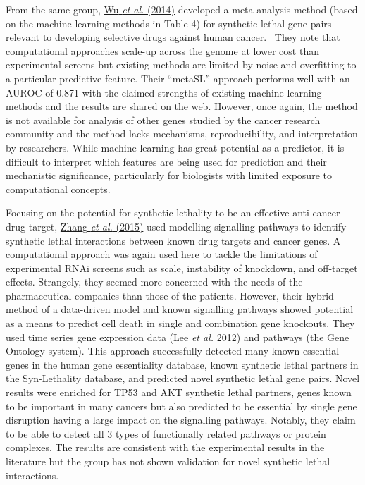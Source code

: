 From the same group,
\hyperlink{ENREF114}{Wu}\hyperlink{ENREF114}{\textit{ et
al.}}\hyperlink{ENREF114}{ (2014)} developed a meta-analysis method
(based on the machine learning methods in Table 4) for synthetic lethal
gene pairs relevant to developing selective drugs against human cancer.
\ They note that computational approaches scale-up across the genome at
lower cost than experimental screens but existing methods are limited
by noise and overfitting to a particular predictive feature. Their
{\textquotedblleft}metaSL{\textquotedblright} approach performs well
with an AUROC of 0.871 with the claimed strengths of existing machine
learning methods and the results are shared on the web. However, once
again, the method is not available for analysis of other genes studied
by the cancer research community and the method lacks mechanisms,
reproducibility, and interpretation by researchers. While machine
learning has great potential as a predictor, it is difficult to
interpret which features are being used for prediction and their
mechanistic significance, particularly for biologists with limited
exposure to computational concepts. 


Focusing on the potential for synthetic lethality to be an effective
anti-cancer drug target,
\hyperlink{ENREF117}{Zhang}\hyperlink{ENREF117}{\textit{ et
al.}}\hyperlink{ENREF117}{ (2015)} used modelling signalling pathways
to identify synthetic lethal interactions between known drug targets
and cancer genes. A computational approach was again used here to
tackle the limitations of experimental RNAi screens such as scale,
instability of knockdown, and off-target effects. Strangely, they
seemed more concerned with the needs of the pharmaceutical companies
than those of the patients. However, their
{\textquotesingle}hybrid{\textquotesingle} method of a data-driven
model and known signalling pathways showed potential as a means to
predict cell death in single and combination gene knockouts. They
used time series gene expression data (Lee\textit{ et al.} 2012) and
pathways (the Gene Ontology system). This approach successfully
detected many known essential genes in the human gene essentiality
database, known synthetic lethal partners in the Syn-Lethality
database, and predicted novel synthetic lethal gene pairs. Novel
results were enriched for TP53 and AKT synthetic lethal partners, genes
known to be important in many cancers but also predicted to be
essential by single gene disruption having a large impact on the
signalling pathways. Notably, they claim to be able to detect all 3
types of functionally related pathways or protein complexes. The
results are consistent with the experimental results in the literature
but the group has not shown validation for novel synthetic lethal
interactions. 


